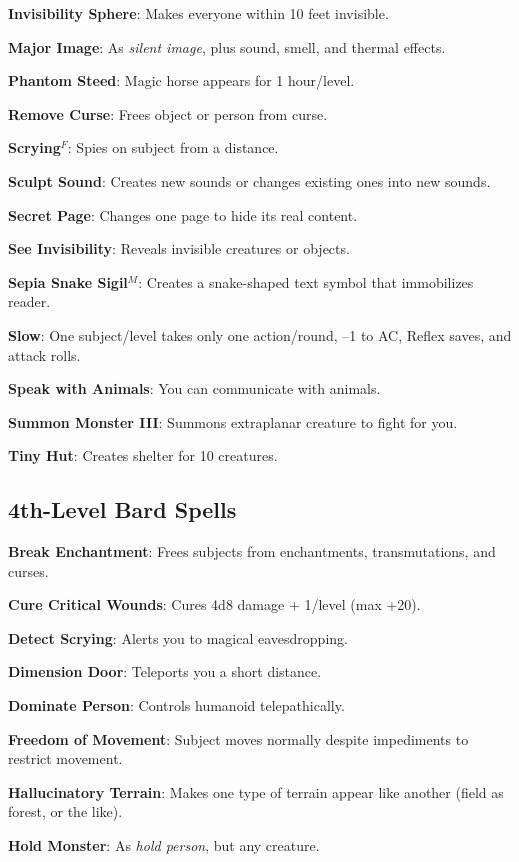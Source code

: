 \textbf{Invisibility Sphere}: Makes everyone within 10 feet invisible.

\textbf{Major Image}: As \textit{silent image}, plus sound, smell, and thermal effects.

\textbf{Phantom Steed}: Magic horse appears for 1 hour/level.

\textbf{Remove Curse}: Frees object or person from curse.

\textbf{Scrying}\(^{F}\): Spies on subject from a distance.

\textbf{Sculpt Sound}: Creates new sounds or changes existing ones into new sounds.

\textbf{Secret Page}: Changes one page to hide its real content.

\textbf{See Invisibility}: Reveals invisible creatures or objects.

\textbf{Sepia Snake Sigil}\(^{M}\): Creates a snake-shaped text symbol that immobilizes reader.

\textbf{Slow}: One subject/level takes only one action/round, --1 to AC, Reflex saves, and attack rolls.

\textbf{Speak with Animals}: You can communicate with animals.

\textbf{Summon Monster III}: Summons extraplanar creature to fight for you.

\textbf{Tiny Hut}: Creates shelter for 10 creatures.

\subsection{4th-Level Bard Spells}


\textbf{Break Enchantment}: Frees subjects from enchantments, transmutations, and curses.

\textbf{Cure Critical Wounds}: Cures 4d8 damage + 1/level (max +20).

\textbf{Detect Scrying}: Alerts you to magical eavesdropping.

\textbf{Dimension Door}: Teleports you a short distance.

\textbf{Dominate Person}: Controls humanoid telepathically.

\textbf{Freedom of Movement}: Subject moves normally despite impediments to restrict movement.

\textbf{Hallucinatory Terrain}: Makes one type of terrain appear like another (field as forest, or the like).

\textbf{Hold Monster}: As \textit{hold person}, but any creature.

